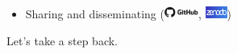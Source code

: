 \begin{frame}{\FAIRB}
\begin{itemize}
    \item Sharing and disseminating (\includegraphics[height=0.4cm]{shared/logo-github.png}, \includegraphics[height=0.4cm]{shared/logo-zenodo.png})
\end{itemize}
\end{frame}


\begin{frame}{\FAIRB}

\huge{Let's take a step back.}

\end{frame}

